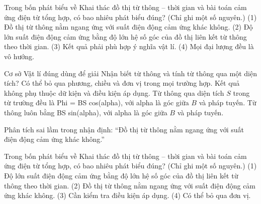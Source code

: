 \begin{ex}
Trong bốn phát biểu về Khai thác đồ thị từ thông – thời gian và bài toán cảm ứng điện từ tổng hợp, có bao nhiêu phát biểu đúng? (Chỉ ghi một số nguyên.) (1) Đồ thị từ thông nằm ngang ứng với suất điện động cảm ứng khác không. (2) Độ lớn suất điện động cảm ứng bằng độ lớn hệ số góc của đồ thị liên kết từ thông theo thời gian. (3) Kết quả phải phù hợp ý nghĩa vật lí. (4) Mọi đại lượng đều là vô hướng.
\end{ex}

\begin{ex}
Cơ sở Vật lí đúng dùng để giải Nhận biết từ thông và tính từ thông qua một diện tích?
\choice
{Có thể bỏ qua phương, chiều và đơn vị trong mọi trường hợp.}
{Kết quả không phụ thuộc dữ kiện và điều kiện áp dụng.}
{\True Từ thông qua diện tích $S$ trong từ trường đều là Phi = BS cos(alpha), với alpha là góc giữa $B$ và pháp tuyến.}
{Từ thông luôn bằng BS sin(alpha), với alpha là góc giữa $B$ và pháp tuyến.}
\end{ex}

\begin{bt}
Phân tích sai lầm trong nhận định: “Đồ thị từ thông nằm ngang ứng với suất điện động cảm ứng khác không.”
\end{bt}

\begin{ex}
Trong bốn phát biểu về Khai thác đồ thị từ thông – thời gian và bài toán cảm ứng điện từ tổng hợp, có bao nhiêu phát biểu đúng? (Chỉ ghi một số nguyên.) (1) Độ lớn suất điện động cảm ứng bằng độ lớn hệ số góc của đồ thị liên kết từ thông theo thời gian. (2) Đồ thị từ thông nằm ngang ứng với suất điện động cảm ứng khác không. (3) Cần kiểm tra điều kiện áp dụng. (4) Có thể bỏ qua đơn vị.
\end{ex}

